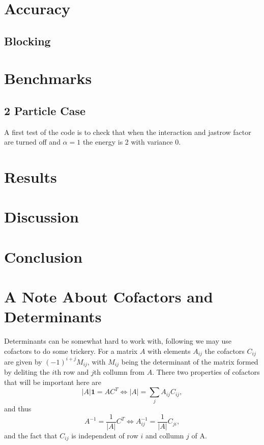 \documentclass[a4paper,norsk,10pt]{article}
\newcommand{\bb}[1]{\boldsymbol{#1}}
\newcommand{\id}{\bb{1}}
\newcommand{\be}{\begin{equation}}
\newcommand{\ee}{\end{equation}}
\newcommand{\f}{\frac}
\begin{document}
\section{Accuracy}

\subsection{Blocking}

\section{Benchmarks}

\subsection{2 Particle Case}
A first test of the code is to check that when the interaction and jastrow factor are turned off and $\alpha = 1$ the energy is 2 with variance 0.

\section{Results}

\section{Discussion}

\section{Conclusion}



\appendix
\section{A Note About Cofactors and Determinants}\label{cofac}
Determinants can be somewhat hard to work with, following \cite{mortenbok} we may use cofactors to do some trickery.
For a matrix $A$ with elements $A_{ij}$ the cofactors $C_{ij}$ are given by $(-1)^{i+j} M_{ij}$, with $M_{ij}$ being the determinant of the matrix formed by deliting the $i$th
row and $j$th collumn from $A$. There two properties of cofactors that will be important here are
\be
|A|\id = A C^T \Leftrightarrow |A| = \sum_jA_{ij}C_{ij},
\ee
and thus
\be
A^{-1} = \f{1}{|A|}C^T \Leftrightarrow A^{-1}_{ij} = \f{1}{|A|}C_{ji},
\ee
and the fact that $C_{ij}$ is independent of row $i$ and collumn $j$ of A.
\end{document}
